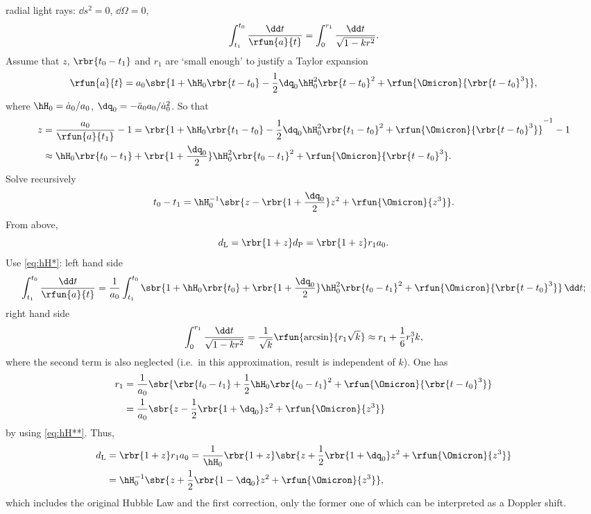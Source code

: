 radial light rays: $\dd s^2 = 0$, $\dd \Omega = 0$,
\begin{equation}
\int_{t_1}^{t_0}\frac{\dd t}{\rfun{a}{t}} = \int_0^{r_1}
\frac{\dd t}{\sqrt{1-kr^2}}.
\label{eq:hH*}
\end{equation}
Assume that $z$, $\rbr{t_0 - t_1}$ and $r_1$ are `small enough' to justify a
Taylor expansion
\begin{equation}
\rfun{a}{t} = a_0\sbr{1 + \hH_0\rbr{t-t_0} - \frac{1}{2}\dq_0 \hH_0^2
\rbr{t-t_0}^2 + \rfun{\Omicron}{\rbr{t-t_0}^3} },
\end{equation}
where $\hH_0 = \dot{a}_0/a_0$, $\dq_0 = -\ddot{a}_0 a_0 / \dot{a}_0^2$. So that
\begin{align}
z &= \frac{a_0}{\rfun{a}{t_1} } - 1
= \rbr{1 + \hH_0\rbr{t_1-t_0} - \frac{1}{2}\dq_0 \hH_0^2 \rbr{t_1 - t_0}^2
+ \rfun{\Omicron}{\rbr{t-t_0}^3}}^{-1} - 1 \nonumber \\
&\approx \hH_0\rbr{t_0-t_1} + \rbr{1+\frac{\dq_0}{2} }\hH_0^2\rbr{t_0 - t_1}^2
+ \rfun{\Omicron}{\rbr{t-t_0}^3}.
\end{align}
Solve recursively
\begin{equation}
t_0 - t_1 = \hH_0^{-1}\sbr{z - \rbr{1+\frac{\dq_0}{2}}z^2 + 
\rfun{\Omicron}{z^3}}.
\label{eq:hH**}
\end{equation}
From above,
\begin{equation}
d_\text{L} = \rbr{1+z} d_\text{P} = \rbr{1+z}r_1 a_0.
\label{eq:p455dL}
\end{equation}
Use
\cref{eq:hH*}: left hand side
\begin{equation}
\int_{t_1}^{t_0} \frac{\dd t}{\rfun{a}{t} } =
\frac{1}{a_0}\int_{t_1}^{t_0}
\sbr{1+\hH_0\rbr{t_0}+\rbr{1+\frac{\dq_0}{2} }\hH_0^2\rbr{t_0 - t_1}^2
+ \rfun{\Omicron}{\rbr{t-t_0}^3}}\,\dd t;
\end{equation}
right hand side
\begin{equation}
\int_0^{r_1} \frac{\dd t}{\sqrt{1-kr^2}} = \frac{1}{\sqrt{k}}
\rfun{\arcsin}{r_1\sqrt{k}} \approx r_1 + \frac{1}{6} r_1^3 k,
\end{equation}
where the second term is also neglected (i.e.\ in this approximation, result
is independent of $k$). One has
\begin{align}
r_1 &= \frac{1}{a_0}\sbr{\rbr{t_0-t_1} + \frac{1}{2}\hH_0\rbr{t_0 - t_1}^2 +
\rfun{\Omicron}{\rbr{t-t_0}^3} } \nonumber \\
&= \frac{1}{a_0}\sbr{z - \frac{1}{2}\rbr{1+\dq_0}z^2 + \rfun{\Omicron}{z^3} }
\end{align}
by using \cref{eq:hH**}. Thus,
\begin{align}
d_\text{L} &= \rbr{1+z}r_1 a_0 = \frac{1}{\hH_0} \rbr{1+z}
\sbr{z+\frac{1}{2}\rbr{1+\dq_0}z^2 +\rfun{\Omicron}{z^3} } \nonumber \\
&= \hH_0^{-1}\sbr{z + \frac{1}{2}\rbr{1-\dq_0}z^2 + \rfun{\Omicron}{z^3} },
\label{eq:eq-in-455}
\end{align}
which includes the original Hubble Law and the first correction, only the former
one of which can be interpreted as a Doppler shift.

